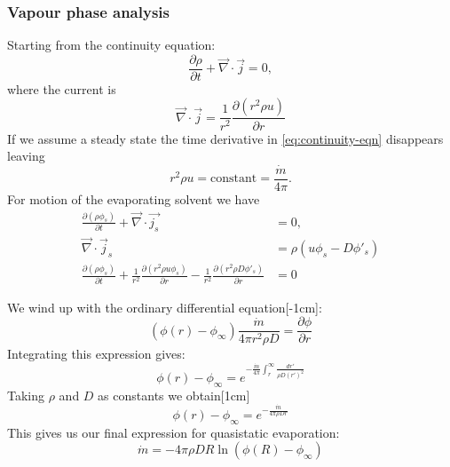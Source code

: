 \documentclass[12pt]{report}
\begin{document}
\subsubsection{Vapour phase analysis}

Starting from the continuity equation:
\begin{equation}\label{eq:continuity-eqn}
  \frac{\partial \rho}{\partial t}
  + \vec{\nabla} \cdot \vec{j} = 0,
\end{equation}
where the current is
\begin{equation}
  \vec{\nabla} \cdot \vec{j} =
  \frac{1}{r^2} \frac{\partial (r^2 \rho u)}{\partial r}
\end{equation}
If we assume a steady state the time derivative in \eqref{eq:continuity-eqn} disappears leaving
\begin{equation}
  r ^2 \rho u = \textrm{constant} = \frac{\dot{m}}{4\pi}.
\end{equation}
For motion of the evaporating solvent we have
\begin{align}
  \frac{\partial (\rho\phi_s)}{\partial t}
  + \vec{\nabla} \cdot \vec{j_s} &= 0, \\
  \vec{\nabla} \cdot \vec{j}_s &=
  \rho (u \phi_s - D \phi'_s) \\
  \frac{\partial (\rho\phi_s)}{\partial t}
  + \frac{1}{r^2} \frac{\partial (r^2 \rho u \phi_s)}{\partial r}
  - \frac{1}{r^2} \frac{\partial (r^2 \rho D \phi'_s)}{\partial r} &= 0
\end{align}

We wind up with the ordinary differential equation[-1cm]:
\begin{equation}
  (\phi(r) - \phi_\infty) \frac{\dot{m}}{4\pi r^2 \rho D}
    = \frac{\partial \phi}{\partial r}
\end{equation}
Integrating this expression gives:
\begin{equation}
  \phi(r) - \phi_\infty =
  e^{-\frac{\dot{m}}{4\pi} \int_r^\infty \frac{dr'}{\rho D (r')^2}}
\end{equation}
Taking $\rho$ and $D$ as constants we obtain[1cm]
\begin{equation}
  \phi(r) - \phi_\infty =
  e^{-\frac{\dot{m}}{4\pi \rho D r}}
\end{equation}
This gives us our final expression for quasistatic evaporation:
\begin{equation}
  \dot{m} = - 4\pi \rho D R \ln{(\phi(R) - \phi_\infty)}
\end{equation}
\end{document}
